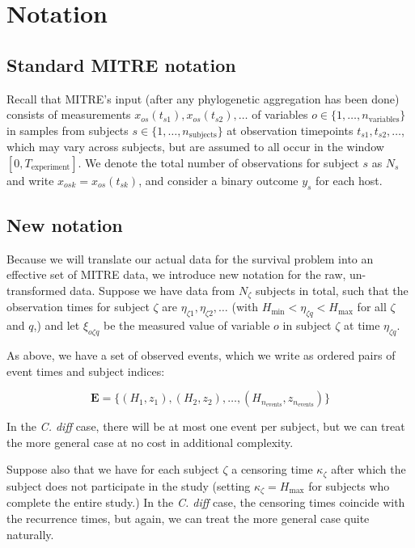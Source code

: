 \documentclass[12pt]{article}
\begin{document}
\section{Notation}
\subsection{Standard MITRE notation}\label{standard}

Recall that MITRE's input (after any phylogenetic aggregation
has been done) consists of measurements $x_{os}(t_{s1}),
x_{os}(t_{s2}), \ldots$ of variables $o \in
\{1,\ldots,n_\text{variables}\}$ in samples from subjects
$s\in\{1,\ldots,n_\text{subjects}\}$ at observation timepoints
$t_{s1},t_{s2},\ldots$, which may vary across subjects, but are
assumed to all occur in the window $[0,T_\text{experiment}]$.  We
denote the total number of observations for subject $s$ as $N_{s}$ and
write $x_{osk}=x_{os}(t_{sk})$, and consider a binary outcome $y_s$
for each host.

\subsection{New notation}
Because we will translate our actual data for the survival problem
into an effective set of MITRE data, we introduce new notation for the
raw, un-transformed data. Suppose we have data from $N_\zeta$ subjects
in total, such that the observation times for subject $\zeta$ are
$\eta_{\zeta1},\eta_{\zeta2}, \ldots$ (with $H_\text{min} <
\eta_{\zeta q} < H_\text{max}$ for all $\zeta$ and $q$,) and let
$\xi_{o\zeta q}$ be the measured value of variable $o$ in subject
$\zeta$ at time $\eta_{\zeta q}$.

As above, we have a set of observed events, which we write
as ordered pairs of event times and subject indices:

\[ \mathbf E = \{(H_1, z_1), (H_2, z_2), \ldots,
(H_{n_\text{events}}, z_{n_\text{events}})\}\]

In the \textit{C. diff} case, there will be at most one event
per subject, but we can treat the more general case at no cost in
additional complexity.

Suppose also that we have for each subject $\zeta$ a censoring time
$\kappa_\zeta$ after which the subject does not participate in the
study (setting $\kappa_\zeta=H_\text{max}$ for subjects who
complete the entire study.)  In the \textit{C. diff} case, the
censoring times coincide with the recurrence times, but again, we can
treat the more general case quite naturally.
\end{document}
